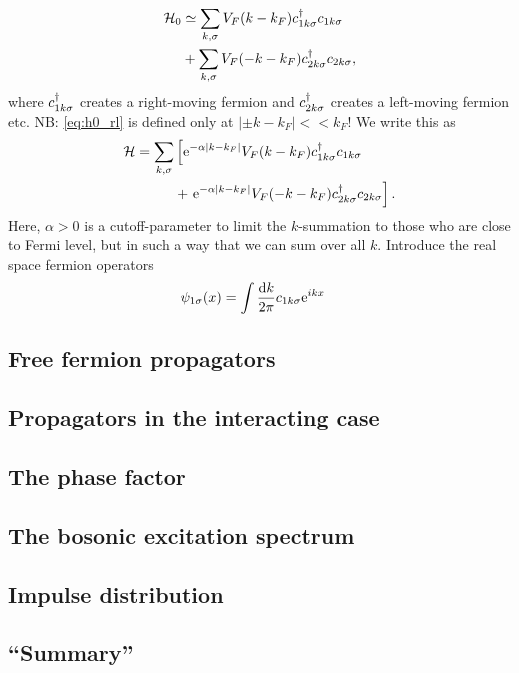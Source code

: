 \begin{align}
\label{eq:h0_rl}
\begin{split}
\mathcal{H}_0 &\simeq \sum_{k,\sigma}V_F(k-k_F)c^{\dagger}_{1k\sigma}c_{1k\sigma} \\
&+\sum_{k,\sigma}V_F(-k-k_F)c^{\dagger}_{2k\sigma}c_{2k\sigma},
\end{split}
\end{align}
where $c^{\dagger}_{1k\sigma}$ creates a right-moving fermion and $c^{\dagger}_{2k\sigma}$ creates a left-moving fermion etc.
NB: \ref{eq:h0_rl} is defined only at $|\pm k-k_F|<<k_F$!
We write this as
\begin{align}
\begin{split}
\mathcal{H}=\sum_{k,\sigma}&\left[\mathrm{e}^{-\alpha|k-k_F|}V_F(k-k_F)c^{\dagger}_{1k\sigma}c_{1k\sigma}\right. \\
&+\left.\mathrm{e}^{-\alpha|k-k_F|}V_F(-k-k_F)c^{\dagger}_{2k\sigma}c_{2k\sigma}\right].
\end{split}
\end{align}
Here, $\alpha>0$ is a cutoff-parameter to limit the $k$-summation to those who are close to Fermi level, but in such a way that we can sum over all $k$.
Introduce the real space fermion operators
\begin{align}
\psi_{1\sigma}(x) & =\int\frac{\dd k}{2\pi}c_{1k\sigma}\mathrm{e}^{ikx}
\end{align}






















\subsection[Free propagators]{Free fermion propagators} %
\subsection[Interacting propagator]{Propagators in  the interacting case} %
\subsection{The phase factor} %
\subsection{The bosonic excitation spectrum} %
\subsection{Impulse distribution} %
\subsection{``Summary''} %

